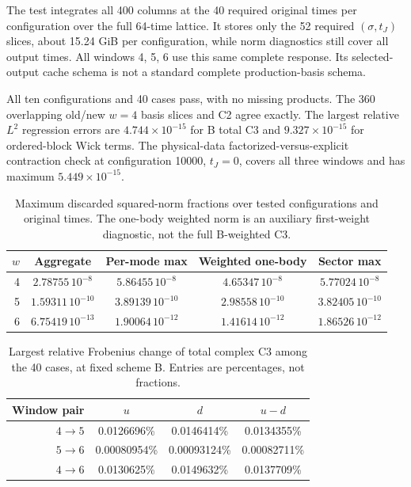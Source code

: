 \documentclass[11pt]{article}
\numberwithin{equation}{section}
\begin{document}
The test integrates all 400 columns at the 40 required original times
per configuration over the full 64-time lattice. It stores only the
52 required \((\sigma,t_J)\) slices, about 15.24 GiB per configuration,
while norm diagnostics still cover all output times. All windows 4, 5, 6
use this same complete response. Its selected-output cache schema is not
a standard complete production-basis schema.

All ten configurations and 40 cases pass, with no missing products.
The 360 overlapping old/new \(w=4\) basis slices and C2 agree exactly.
The largest relative \(L^2\) regression errors are
\(4.744\times10^{-15}\) for B total C3 and
\(9.327\times10^{-15}\) for ordered-block Wick terms.
The physical-data factorized-versus-explicit contraction check at
configuration 10000, \(t_J=0\), covers all three windows and has maximum
\(5.449\times10^{-15}\).

\begin{table}[htbp]
 \centering
 \caption{Maximum discarded squared-norm fractions over tested
 configurations and original times. The one-body weighted norm is an
 auxiliary first-weight diagnostic, not the full B-weighted C3.}
 \label{tab:window-norm-oct15}
 \begin{tabular}{rcccc}
 \toprule
 \(w\) & Aggregate & Per-mode max & Weighted one-body & Sector max\\
 \midrule
 4 & \(2.78755\,10^{-8}\) & \(5.86455\,10^{-8}\)
   & \(4.65347\,10^{-8}\) & \(5.77024\,10^{-8}\)\\
 5 & \(1.59311\,10^{-10}\) & \(3.89139\,10^{-10}\)
   & \(2.98558\,10^{-10}\) & \(3.82405\,10^{-10}\)\\
 6 & \(6.75419\,10^{-13}\) & \(1.90064\,10^{-12}\)
   & \(1.41614\,10^{-12}\) & \(1.86526\,10^{-12}\)\\
 \bottomrule
 \end{tabular}
\end{table}
\begin{table}[htbp]
 \centering
 \caption{Largest relative Frobenius change of total complex C3 among
 the 40 cases, at fixed scheme B. Entries are percentages, not fractions.}
 \label{tab:window-c3-oct15}
 \begin{tabular}{rccc}
 \toprule
 Window pair & \(u\) & \(d\) & \(u-d\)\\
 \midrule
 \(4\to5\)&0.0126696\%&0.0146414\%&0.0134355\%\\
 \(5\to6\)&0.00080954\%&0.00093124\%&0.00082711\%\\
 \(4\to6\)&0.0130625\%&0.0149632\%&0.0137709\%\\
 \bottomrule
 \end{tabular}
\end{table}
\end{document}
